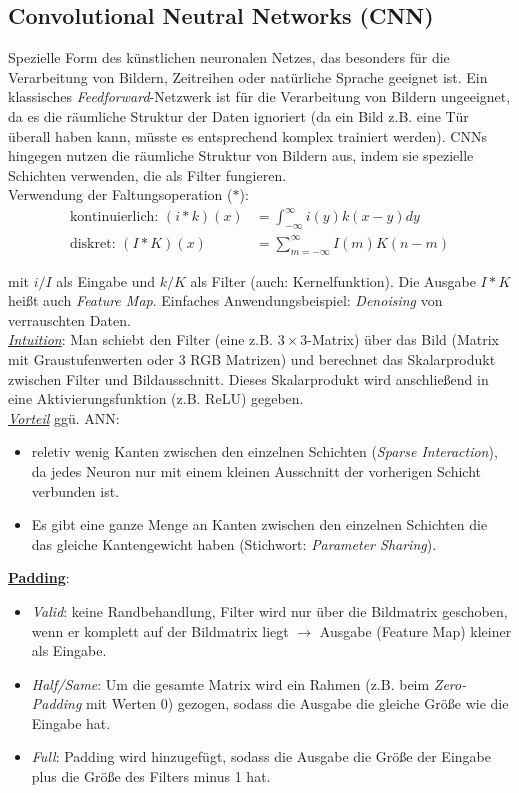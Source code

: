 \subsection{Convolutional Neutral Networks (CNN)}
\label{cnn}
Spezielle Form des künstlichen neuronalen Netzes, das besonders für die Verarbeitung von Bildern, Zeitreihen oder natürliche Sprache geeignet ist.
Ein klassisches \emph{Feedforward}-Netzwerk ist für die Verarbeitung von Bildern ungeeignet, da es die räumliche Struktur der Daten ignoriert (da ein Bild z.B. eine Tür überall haben kann, müsste es entsprechend komplex trainiert werden).
CNNs hingegen nutzen die räumliche Struktur von Bildern aus, indem sie spezielle Schichten verwenden, die als Filter fungieren.\\

Verwendung der Faltungsoperation ($*$):
\begin{equation*}
    \begin{aligned}
        \text{kontinuierlich: }(i*k)(x) &= \int_{-\infty}^{\infty}i(y)k(x-y)dy\\
        \text{diskret: }(I*K)(x) &= \sum_{m=-\infty}^{\infty}I(m)K(n-m)
    \end{aligned}
\end{equation*}

mit $i/I$ als Eingabe und $k/K$ als Filter (auch: Kernelfunktion). Die Ausgabe $I*K$ heißt auch \emph{Feature Map}. Einfaches Anwendungsbeispiel:
\emph{Denoising} von verrauschten Daten.\\

\underline{\emph{Intuition}}: Man schiebt den Filter (eine z.B. $3\times 3$-Matrix) über das Bild (Matrix mit Graustufenwerten oder 3 RGB Matrizen) und berechnet das Skalarprodukt zwischen Filter und Bildausschnitt. Dieses Skalarprodukt wird anschließend in eine Aktivierungsfunktion (z.B. ReLU) gegeben.\\

\underline{\emph{Vorteil}} ggü. ANN: 
\begin{itemize}
    \item reletiv wenig Kanten zwischen den einzelnen Schichten (\emph{Sparse Interaction}), da jedes Neuron nur mit einem kleinen Ausschnitt der vorherigen Schicht verbunden ist.
    \item Es gibt eine ganze Menge an Kanten zwischen den einzelnen Schichten die das gleiche Kantengewicht haben (Stichwort: \emph{Parameter Sharing}).
\end{itemize}

\underline{\textbf{Padding}}:
\begin{itemize}
    \item \emph{Valid}: keine Randbehandlung, Filter wird nur über die Bildmatrix geschoben, wenn er komplett auf der Bildmatrix liegt $\rightarrow$ Ausgabe (Feature Map) kleiner als Eingabe.
    \item \emph{Half/Same}: Um die gesamte Matrix wird ein Rahmen (z.B. beim \emph{Zero-Padding} mit Werten $0$) gezogen, sodass die Ausgabe die gleiche Größe wie die Eingabe hat.
    \item \emph{Full}: Padding wird hinzugefügt, sodass die Ausgabe die Größe der Eingabe plus die Größe des Filters minus 1 hat.
\end{itemize}

